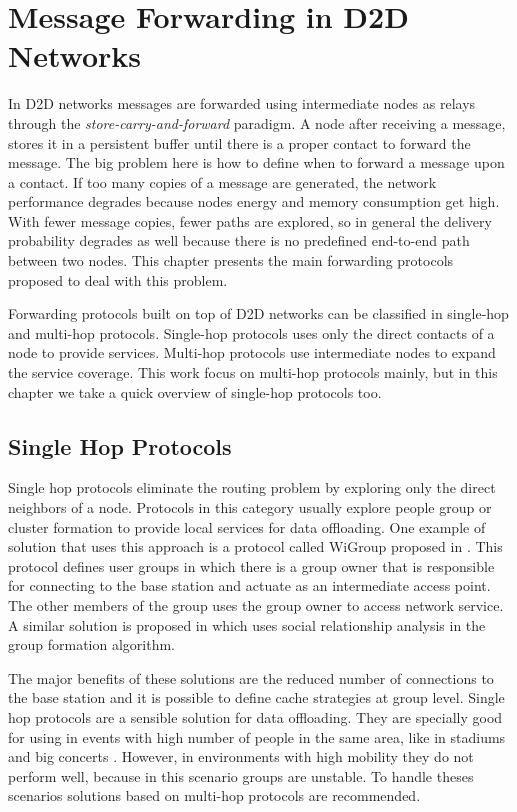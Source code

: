 \chapter{Message Forwarding in D2D Networks}
\label{ch:MessageForwarding}

In D2D networks messages are forwarded using intermediate nodes as relays through the \textit{store-carry-and-forward} paradigm. A node after receiving a message,
stores it in a persistent buffer until there is a proper contact to forward the message. The big problem here is how to define when to forward a message upon a contact.
If too many copies of a message are generated, the network performance degrades because nodes energy and memory consumption get high. With fewer message copies, fewer paths
are explored, so in general the delivery probability degrades as well because there is no predefined end-to-end path between two nodes. This chapter presents the main forwarding
protocols proposed to deal with this problem.

Forwarding protocols built on top of D2D networks can be classified in single-hop and multi-hop protocols. Single-hop protocols uses only the direct contacts of a node to provide
services. Multi-hop protocols use intermediate nodes to expand the service coverage. This work focus on multi-hop protocols mainly, but in this chapter we take a quick overview of single-hop
protocols too.

\section{Single Hop Protocols}

Single hop protocols eliminate the routing problem by exploring only the direct neighbors of a node.
Protocols in this category usually explore people group or cluster formation to provide local services for data offloading.
One example of solution that uses this approach is a protocol called WiGroup proposed in \cite{wang2015wigroup}.
This protocol defines user groups in which there is a group owner that is responsible for connecting to the base station
and actuate as an intermediate access point. The other members of the group uses the group owner to access network service.
A similar solution is proposed in \cite{zheng2014social} which uses social relationship analysis in the group formation algorithm.

The major benefits of these solutions are the reduced number of connections to the base station and it is possible to define cache strategies at group level.
Single hop protocols are a sensible solution for data offloading. They are specially good for using in events with high number of people in the same area, like in
stadiums and big concerts \cite{wang2015wigroup}. However, in environments with high mobility they do not perform well, because in this scenario groups are unstable.
To handle theses scenarios solutions based on multi-hop protocols are recommended.

